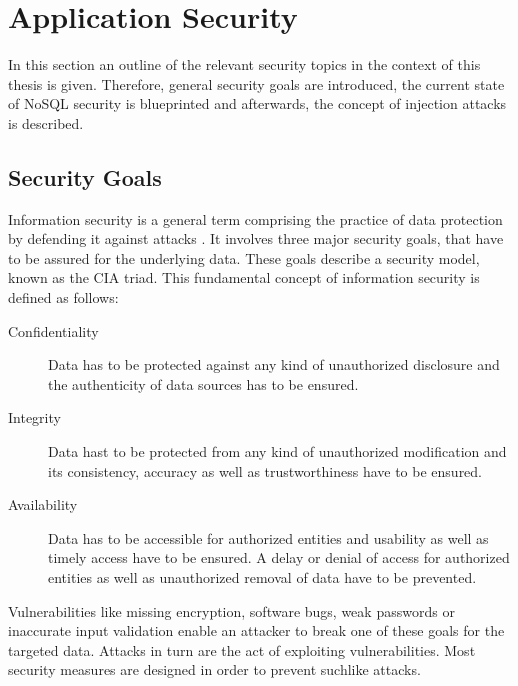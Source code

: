 \section{Application Security}
In this section an outline of the relevant security topics in the context of this thesis is given. Therefore, general security goals are introduced, the current state of NoSQL security is blueprinted and afterwards, the concept of injection attacks is described.

\subsection{Security Goals}
Information security is a general term comprising the practice of data protection by defending it against attacks \cite{olivier2002database,Perrin:2008}. It involves three major security goals, that have to be assured for the underlying data. These goals describe a security model, known as the CIA triad. This fundamental concept of information security is defined as follows:

\begin{description}
\item [Confidentiality] Data has to be protected against any kind of unauthorized disclosure and the authenticity of data sources has to be ensured.
\item [Integrity] Data hast to be protected from any kind of unauthorized modification and its consistency, accuracy as well as trustworthiness have to be ensured.
\item [Availability] Data has to be accessible for authorized entities and usability as well as timely access have to be ensured. A delay or denial of access for authorized entities as well as unauthorized removal of data have to be prevented.
\end{description}

Vulnerabilities like missing encryption, software bugs, weak passwords or inaccurate input validation enable an attacker to break one of these goals for the targeted data. Attacks in turn are the act of exploiting vulnerabilities. Most security measures are designed in order to prevent suchlike attacks.

